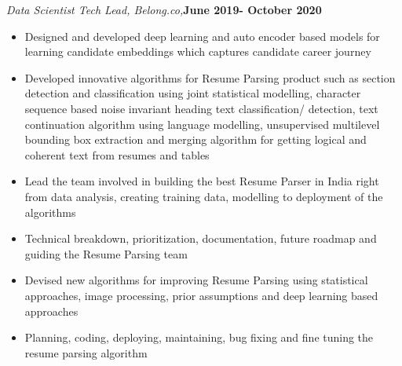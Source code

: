 \documentclass[line]{resume}
\begin{document}
{\begin{resume}
\begin{list2}
			\item \emph{Data Scientist Tech Lead, Belong.co,}\hfill \textbf{June 2019- October 2020}
			\begin{itemize}
			\item Designed and developed deep learning and auto encoder based models for learning candidate embeddings which captures candidate career journey
			\item Developed innovative algorithms for Resume Parsing product such as section detection and classification using joint statistical modelling, character sequence based noise invariant heading text classification/ detection,   text continuation algorithm using language modelling, unsupervised multilevel bounding box extraction and merging algorithm for getting logical and coherent text from resumes and tables
			\item Lead the team involved in building the best Resume Parser in India right from data analysis, creating training data, modelling to deployment of the algorithms
				\item Technical breakdown, prioritization, documentation, future roadmap and guiding the Resume Parsing team 
				\item Devised new algorithms for improving Resume Parsing using statistical approaches, image processing, prior assumptions and deep learning based approaches  
				\item Planning, coding, deploying, maintaining, bug fixing and fine tuning the resume parsing algorithm
			\end{itemize}
				

\end{list2}
\end{resume}}
\end{document}
